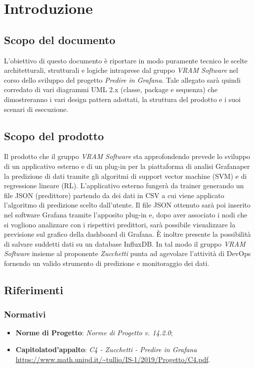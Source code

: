 \section{Introduzione}
    \subsection{Scopo del documento}
        L'obiettivo di questo documento è riportare in modo puramente tecnico le scelte architetturali, strutturali e logiche intraprese dal gruppo \textit{VRAM Software} nel corso dello sviluppo del progetto \textit{Predire in Grafana}. Tale allegato sarà quindi corredato di vari diagrammi UML 2.x (classe, package e sequenza) che dimostreranno i vari design pattern adottati, la struttura del prodotto e i suoi scenari di esecuzione.
    \subsection{Scopo del prodotto}
        Il prodotto che il gruppo \textit{VRAM Software} sta approfondendo prevede lo sviluppo di un applicativo esterno e di un plug-in per la piattaforma di analisi Grafana\glosp per la predizione di dati tramite gli algoritmi di support vector machine (SVM) e di regressione lineare (RL). L'applicativo esterno fungerà da trainer generando un file JSON (predittore) partendo da dei dati in CSV a cui viene applicato l'algoritmo di predizione scelto dall'utente. Il file JSON ottenuto sarà poi inserito nel software Grafana tramite l'apposito plug-in e, dopo aver associato i nodi che si vogliono analizzare con i rispettivi predittori, sarà possibile visualizzare la previsione sul grafico della dashboard di Grafana. È inoltre presente la possibilità di salvare suddetti dati su un database InfluxDB. In tal modo il gruppo \textit{VRAM Software} insieme al proponente \textit{Zucchetti} punta ad agevolare l'attività di DevOps fornendo un valido strumento di predizione e monitoraggio dei dati.
    \subsection{Riferimenti}
        \subsubsection{Normativi}
            \begin{itemize}
                \item \textbf{Norme di Progetto}: \textit{Norme di Progetto v. 14.2.0};
                \item \textbf{Capitolato}\glosp \textbf{d'appalto}: \textit{C4 - Zucchetti - Predire in Grafana} \\
                 \url{https://www.math.unipd.it/~tullio/IS-1/2019/Progetto/C4.pdf}.
            \end{itemize}
